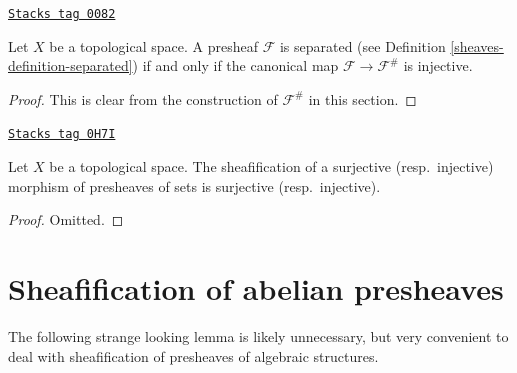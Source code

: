 \begin{lemma}
\label{sheaves-lemma-separated-presheaf-into-sheaf}
\href{https://stacks.math.columbia.edu/tag/0082}{\texttt{Stacks tag 0082}}

Let $X$ be a topological space.
A presheaf $\mathcal{F}$ is separated (see
Definition \ref{sheaves-definition-separated}) if and only if
the canonical map $\mathcal{F} \to \mathcal{F}^\#$ is injective.
\end{lemma}

\begin{proof}
This is clear from the construction of $\mathcal{F}^\#$ in this
section.
\end{proof}

\begin{lemma}
\label{sheaves-lemma-sheafify-epi-mono}
\href{https://stacks.math.columbia.edu/tag/0H7I}{\texttt{Stacks tag 0H7I}}

Let $X$ be a topological space. The sheafification of a surjective
(resp.\ injective) morphism of presheaves of sets is surjective
(resp.\ injective).
\end{lemma}

\begin{proof}
Omitted.
\end{proof}

\section{Sheafification of abelian presheaves}
\label{sheaves-section-sheafify-abelian-presheaves}
The following strange looking lemma is likely unnecessary, but
very convenient to deal with sheafification of presheaves
of algebraic structures.

